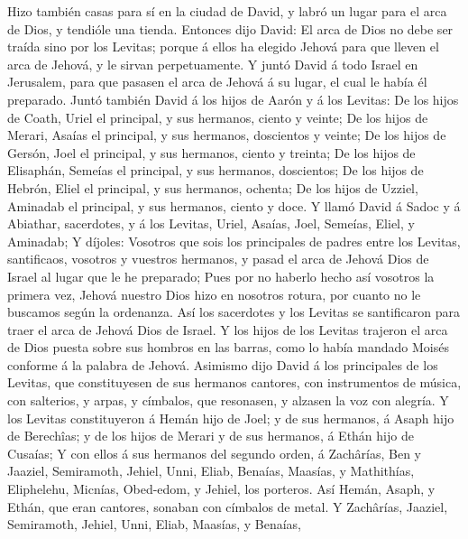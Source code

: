  Hizo también casas para sí en la ciudad de David, y labró
un lugar para el arca de Dios, y tendióle una tienda. 
Entonces dijo David: El arca de Dios no debe ser traída sino por los
Levitas; porque á ellos ha elegido Jehová para que lleven el arca de
Jehová, y le sirvan perpetuamente.  Y juntó David á todo
Israel en Jerusalem, para que pasasen el arca de Jehová á su lugar, el
cual le había él preparado.  Juntó también David á los
hijos de Aarón y á los Levitas:  De los hijos de Coath,
Uriel el principal, y sus hermanos, ciento y veinte;  De
los hijos de Merari, Asaías el principal, y sus hermanos, doscientos y
veinte;  De los hijos de Gersón, Joel el principal, y sus
hermanos, ciento y treinta;  De los hijos de Elisaphán,
Semeías el principal, y sus hermanos, doscientos;  De los
hijos de Hebrón, Eliel el principal, y sus hermanos, ochenta;
 De los hijos de Uzziel, Aminadab el principal, y sus
hermanos, ciento y doce.  Y llamó David á Sadoc y á
Abiathar, sacerdotes, y á los Levitas, Uriel, Asaías, Joel, Semeías,
Eliel, y Aminadab;  Y díjoles: Vosotros que sois los
principales de padres entre los Levitas, santificaos, vosotros y
vuestros hermanos, y pasad el arca de Jehová Dios de Israel al lugar que
le he preparado;  Pues por no haberlo hecho así vosotros
la primera vez, Jehová nuestro Dios hizo en nosotros rotura, por cuanto
no le buscamos según la ordenanza.  Así los sacerdotes y
los Levitas se santificaron para traer el arca de Jehová Dios de Israel.
 Y los hijos de los Levitas trajeron el arca de Dios
puesta sobre sus hombros en las barras, como lo había mandado Moisés
conforme á la palabra de Jehová.  Asimismo dijo David á
los principales de los Levitas, que constituyesen de sus hermanos
cantores, con instrumentos de música, con salterios, y arpas, y
címbalos, que resonasen, y alzasen la voz con alegría.  Y
los Levitas constituyeron á Hemán hijo de Joel; y de sus hermanos, á
Asaph hijo de Berechîas; y de los hijos de Merari y de sus hermanos, á
Ethán hijo de Cusaías;  Y con ellos á sus hermanos del
segundo orden, á Zachârías, Ben y Jaaziel, Semiramoth, Jehiel, Unni,
Eliab, Benaías, Maasías, y Mathithías, Eliphelehu, Micnías, Obed-edom, y
Jehiel, los porteros.  Así Hemán, Asaph, y Ethán, que
eran cantores, sonaban con címbalos de metal.  Y
Zachârías, Jaaziel, Semiramoth, Jehiel, Unni, Eliab, Maasías, y Benaías,
